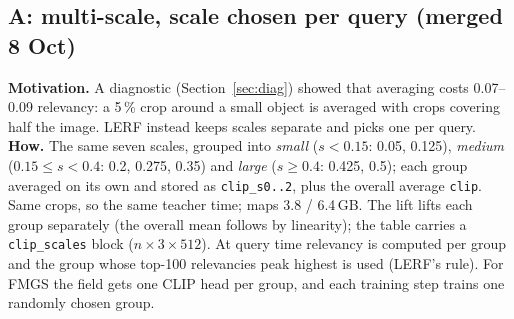 \documentclass[11pt,a4paper]{article}
\newcommand{\code}[1]{\texttt{#1}}
\begin{document}
\subsection{A: multi-scale, scale chosen per query (merged 8 Oct)}
\textbf{Motivation.} A diagnostic (Section~\ref{sec:diag}) showed that averaging costs 0.07--0.09 relevancy: a 5\,\% crop
around a small object is averaged with crops covering half the image. LERF instead keeps scales separate and picks one
per query.\\
\textbf{How.} The same seven scales, grouped into \emph{small} ($s<0.15$: 0.05, 0.125), \emph{medium}
($0.15\le s<0.4$: 0.2, 0.275, 0.35) and \emph{large} ($s\ge0.4$: 0.425, 0.5); each group averaged on its own and stored as
\code{clip\_s0..2}, plus the overall average \code{clip}. Same crops, so the same teacher time; maps 3.8 / 6.4\,GB.
The lift lifts each group separately (the overall mean follows by linearity); the table carries a
\code{clip\_scales} block ($n\times3\times512$). At query time relevancy is computed per group and the group whose top-100
relevancies peak highest is used (LERF's rule). For FMGS the field gets one CLIP head per group, and each training step
trains one randomly chosen group.
\end{document}
